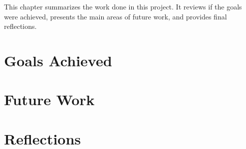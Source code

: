 This chapter summarizes the work done in this project. 
It reviews if the goals were achieved, presents the main areas of future work, and provides final reflections.
\section{Goals Achieved}
    
\section{Future Work}
    
\section{Reflections}

